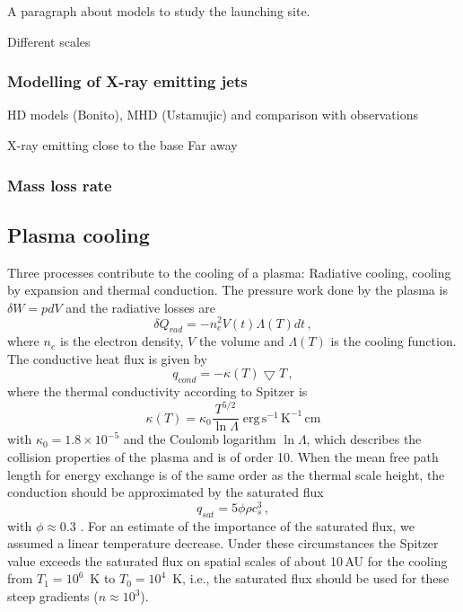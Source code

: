 A paragraph about models to study the launching site.

Different scales

\subsubsection{Modelling of X-ray emitting jets}
\citet{Raga_2002}

HD models (Bonito), MHD (Ustamujic) and comparison with observations

X-ray emitting close to the base
Far away

\subsubsection{Mass loss rate}

\subsection{Plasma cooling \label{sect:cooling}}
Three processes contribute to the cooling of a plasma: Radiative cooling, cooling by expansion and thermal conduction.
The pressure work done by the plasma is $\delta W = p dV$ and the radiative losses are
\begin{equation}
\delta Q_{rad} = -n_e^2 V(t) \Lambda(T) dt\,,
\end{equation}
where $n_e$ is the electron density, $V$ the volume and $\Lambda(T)$ is the cooling function.
The conductive heat flux is given by
\begin{equation}
q_{cond} = -\kappa(T)\bigtriangledown T\,, \label{eq:cond}
\end{equation}
where the thermal conductivity according to Spitzer is
\begin{equation}
\kappa(T) = \kappa_0 \frac{T^{5/2}}{\ln \Lambda}\;\mbox{erg}\,\mbox{s}^{-1}\,\mbox{K}^{-1}\,\mbox{cm}
\end{equation}
with $\kappa_0=1.8\times10^{-5}$ and the Coulomb logarithm $\ln \Lambda$, which describes the collision properties of the plasma and is of order 10.
When the mean free path length for energy exchange is of the same order as the thermal scale height, the conduction should be approximated by the saturated flux
\begin{equation}
q_{sat} = 5 \phi \rho c_s^3\,,
\end{equation}
with $\phi\approx0.3$ \citep[e.g.][$\rho$ is the mass density and $c_s$ is the local sound speed]{Borkowski_1989}. For an estimate of the importance of the saturated flux, we assumed a linear temperature decrease. Under these circumstances the Spitzer value  exceeds the saturated flux on spatial scales of about 10\,AU for the cooling from $T_1=10^6$~K to $T_0=10^4$~K, i.e., the saturated flux should be used for these steep gradients ($n\approx10^3$).




